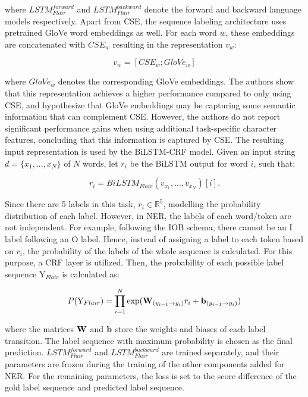 \documentclass{report}
\theoremstyle{definition}
\theoremstyle{remark}
\begin{document}
\noindent where $LSTM^{forward}_{Flair}$ and $LSTM^{backward}_{Flair}$ denote the forward and backward language models respectively. Apart from CSE, the sequence labeling architecture uses pretrained GloVe \cite{glove} word embeddings as well. For each word $w$, these embeddings are concatenated with $CSE_w$ resulting in the representation $v_w$:

\begin{equation}
    v_w = [CSE_w;GloVe_w]
\end{equation}

\noindent where $GloVe_w$ denotes the corresponding GloVe embeddings. The authors show that this representation achieves a higher performance compared to only using CSE, and hypothesize that GloVe embeddings may be capturing some semantic information that can complement CSE. However, the authors do not report significant performance gains when using additional task-specific character features, concluding that this information is captured by CSE. The resulting input representation is used by the BiLSTM-CRF model. Given an input string $d=\{x_1,...,x_N\}$ of $N$ words, let $r_i$ be the BiLSTM output for word $i$, such that:

\begin{equation}
    r_i = BiLSTM_{Flair}(v_{x_1},...,v_{x_N})[i].
\end{equation}

Since there are 5 labels in this task, $r_i \in \mathbb{R}^5$, modelling the probability distribution of each label. However, in NER, the labels of each word/token are not independent. For example, following the IOB schema, there cannot be an I label following an O label. Hence, instead of assigning a label to each token based on $r_i$, the probability of the labels of the whole sequence is calculated. For this purpose, a CRF layer is utilized. Then, the probability of each possible label sequence $\text{Y}_{Flair}$ is calculated as:

\begin{equation}
    P(\text{Y}_{Flair}) = \prod_{i=1}^N \text{exp}( \bold{W}_{(y_{i-1} \rightarrow y_i)}r_i + \bold{b}_{(y_{i-1} \rightarrow y_i)})
\end{equation}

\noindent where the matrices $\bold{W}$ and $\bold{b}$ store the weights and biases of each label transition. The label sequence with maximum probability is chosen as the final prediction. $LSTM^{forward}_{Flair}$ and $LSTM^{backward}_{Flair}$ are trained separately, and their parameters are frozen during the training of the other components added for NER. For the remaining parameters, the loss is set to the score difference of the gold label sequence and predicted label sequence.
\end{document}
